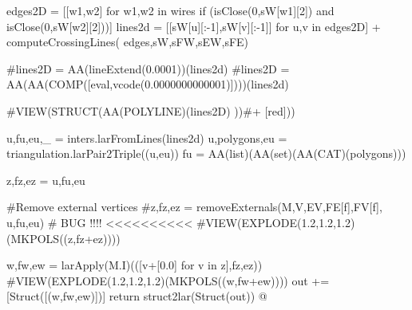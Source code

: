 \documentclass[11pt,oneside]{article}    %
\begin{document}
{        edges2D = [[w1,w2] for w1,w2 in wires if (isClose(0,sW[w1][2]) and isClose(0,sW[w2][2]))]
        lines2d = [[sW[u][:-1],sW[v][:-1]] for u,v in edges2D] + computeCrossingLines(
                    edges,sW,sFW,sEW,sFE)
                    
        #lines2D = AA(lineExtend(0.0001))(lines2d)
        #lines2D = AA(AA(COMP([eval,vcode(0.0000000000001)])))(lines2d)          

        #VIEW(STRUCT(AA(POLYLINE)(lines2D) ))#+ [red]))
        
        u,fu,eu,_ = inters.larFromLines(lines2d)
        u,polygons,eu = triangulation.larPair2Triple((u,eu))
        fu = AA(list)(AA(set)(AA(CAT)(polygons)))
        
        z,fz,ez = u,fu,eu
        
        #Remove external vertices 
        #z,fz,ez = removeExternals(M,V,EV,FE[f],FV[f], u,fu,eu)  # BUG !!!!  <<<<<<<<<<
        #VIEW(EXPLODE(1.2,1.2,1.2)(MKPOLS((z,fz+ez))))
        
        
        w,fw,ew = larApply(M.I)(([v+[0.0] for v in z],fz,ez))
        #VIEW(EXPLODE(1.2,1.2,1.2)(MKPOLS((w,fw+ew))))
        out += [Struct([(w,fw,ew)])]
    return struct2lar(Struct(out))
@}
\end{document}
